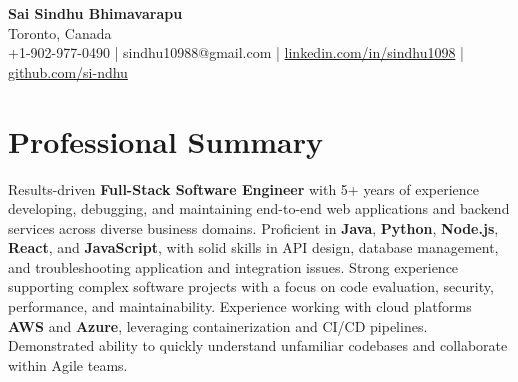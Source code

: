 \documentclass[letterpaper,11pt]{article}
\begin{document}
\begin{center}
  {\Large \textbf{Sai Sindhu Bhimavarapu}} \\
  Toronto, Canada \\
  +1-902-977-0490 \enspace | \enspace sindhu10988@gmail.com \enspace | \enspace \href{https://www.linkedin.com/in/sindhu1098/}{linkedin.com/in/sindhu1098} \enspace | \enspace \href{https://github.com/si-ndhu}{github.com/si-ndhu}
\end{center}

\section{Professional Summary}
  \begin{itemize}[leftmargin=0.15in, label={}]
    \small{\item{
     Results-driven \textbf{Full-Stack Software Engineer} with 5+ years of experience developing, debugging, and maintaining end-to-end web applications and backend services across diverse business domains. Proficient in \textbf{Java}, \textbf{Python}, \textbf{Node.js}, \textbf{React}, and \textbf{JavaScript}, with solid skills in API design, database management, and troubleshooting application and integration issues. Strong experience supporting complex software projects with a focus on code evaluation, security, performance, and maintainability. Experience working with cloud platforms \textbf{AWS} and \textbf{Azure}, leveraging containerization and CI/CD pipelines. Demonstrated ability to quickly understand unfamiliar codebases and collaborate within Agile teams.
    }}
  \end{itemize}
\vspace{-16pt}

\end{document}
